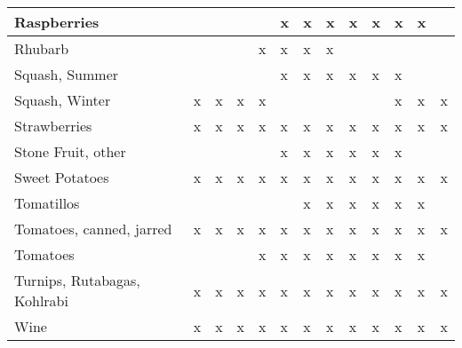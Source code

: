 \documentclass[../main.tex]{subfiles}
\begin{document}
\begin{longtable}{l|l|l|l|l|l|l|l|l|l|l|l|l|}
    Raspberries & & & & &x &x &x &x &x &x &x & \\ \hline
    Rhubarb & & & &x &x &x &x & & & & & \\ \hline
    Squash, Summer & & & & &x &x &x &x &x &x & & \\ \hline
    Squash, Winter &x &x &x &x & & & & & &x &x &x \\ \hline
    Strawberries &x &x &x &x &x &x &x &x &x &x &x &x \\ \hline
    Stone Fruit, other & & & & &x &x &x &x &x &x & & \\ \hline
    Sweet Potatoes &x &x &x &x &x &x &x &x &x &x &x &x \\ \hline
    Tomatillos & & & & & &x &x &x &x &x &x & \\ \hline
    Tomatoes, canned, jarred &x &x &x &x &x &x &x &x &x &x &x &x \\ \hline
    Tomatoes & & & &x &x &x &x &x &x &x &x & \\ \hline
    Turnips, Rutabagas, Kohlrabi &x &x &x &x &x &x &x &x &x &x &x &x \\ \hline
    Wine &x &x &x &x &x &x &x &x &x &x &x &x \\ \hline
  \end{longtable}
\end{document}
